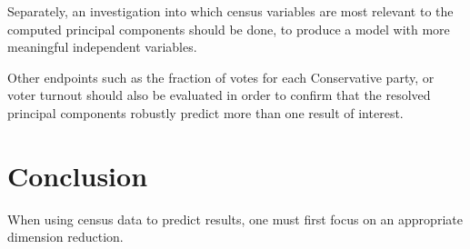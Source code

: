 \documentclass{article}
\begin{document}
Separately, an investigation into which census variables are most relevant to the computed principal components should be done, to produce a model with more meaningful independent variables.

Other endpoints such as the fraction of votes for each Conservative party, or voter turnout should also be evaluated in order to confirm that the resolved principal components robustly predict more than one result of interest.

\section{Conclusion}

When using census data to predict results, one must first focus on an appropriate dimension reduction.

\medskip

\small
\end{document}
